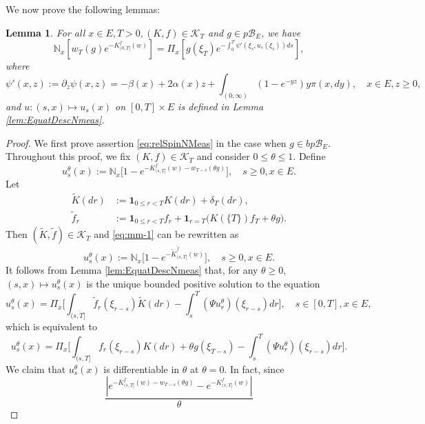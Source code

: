 \documentclass[UTF8]{pkuthss}
\theoremstyle{plain}
\newtheorem{lem}[thm]{Lemma}
\theoremstyle{definition}
\numberwithin{equation}{section}
\begin{document}
We now prove the following lemmas:
\begin{lem}\label{lem:relSpinNMeas}
	For all $x\in E, T>0, (K,f) \in \mathcal K_T$ and $g \in p\mathscr B_E$, we have
\begin{equation}\label{eq:relSpinNMeas}
	\mathbb N_x[w_T(g) e^{-K_{(0, T]}^f(w)}]
	= \Pi_x[g(\xi_T) e^{-\int_0^T \psi'(\xi_s,u_s(\xi_s)) ds}],
\end{equation}
	where
\[
	\psi'(x,z)
	:= \partial_z \psi(x,z)
	= - \beta(x) + 2 \alpha(x) z + \int_{(0,\infty)} (1 - e^{-yz}) y \pi(x,dy),
	\quad x \in E, z \geq 0,
\]
	and $u: (s,x) \mapsto u_s(x)$ on $[0,T] \times E$ is defined in Lemma \ref{lem:EquatDescNmeas}.
\end{lem}
\begin{proof}
	We first prove assertion \eqref{eq:relSpinNMeas} in the case when $g \in bp\mathscr B_E$.
	Throughout this proof, we fix $(K,f) \in \mathcal K_T$ and consider $0 \leq \theta \leq 1$.
	Define
\begin{equation}\label{eq:mm-1}
	u_s^\theta(x)
	:=	\mathbb N_x \big[ 1 - e^{ - K_{(s, T]}^f(w) - w_{T-s}(\theta g)} \big],
	\quad s \geq 0, x\in E.
\end{equation}
	Let
\begin{align}
	\tilde K(dr)
	&:=	\mathbf 1_{0\leq r<T} K(dr) + \delta_T (dr), \\
	\tilde f_r
	&:=	\mathbf 1_{0\leq r<T} f_r + \mathbf 1_{r=T} \big( K(\{T\}) f_T + \theta g \big).
\end{align}
	Then $(\tilde K, \tilde f) \in \mathcal K_T$ and \eqref{eq:mm-1} can be rewritten as
\[
	u_s^\theta(x)
	:=	\mathbb N_x \big[ 1 - e^{ - \tilde K_{(s, T]}^{\tilde f} (w)} \big],
	\quad s \geq 0, x\in E.
\]
	It follows from Lemma \ref{lem:EquatDescNmeas} that, for any
$\theta \geq 0$, $(s,x) \mapsto u^\theta_s(x)$ is the unique bounded positive solution to the equation
\[	
	u_s^\theta(x)
	=\Pi_{x} \Big[ \int_{(s,T]} \tilde f_r(\xi_{r-s}) \tilde K(dr) - \int_s^T (\Psi u_r^\theta)(\xi_{r-s}) dr \Big],
	\quad s\in [0,T],x\in E,
\]
	which is equivalent to
\begin{equation}
\label{eq:mewth}
	u_s^\theta(x)
    = \Pi_{x} \Big[\int_{(s,T]} f_r(\xi_{r-s}) K(dr) + \theta g(\xi_{T-s}) - \int_s^T (\Psi u^\theta_r)(\xi_{r-s})dr\Big].
\end{equation}
	We claim that $u_s^\theta(x)$ is differentiable in $\theta$ at $\theta = 0$.
	In fact, since
\begin{equation}\label{eq:sbN-1}
	\frac {|e^{-K_{(s, T]}^f(w)-w_{T-s}(\theta g)} - e^{-K_{(s, T]}^f(w)}|} {\theta}

\end{equation}
\end{proof}
\end{document}
